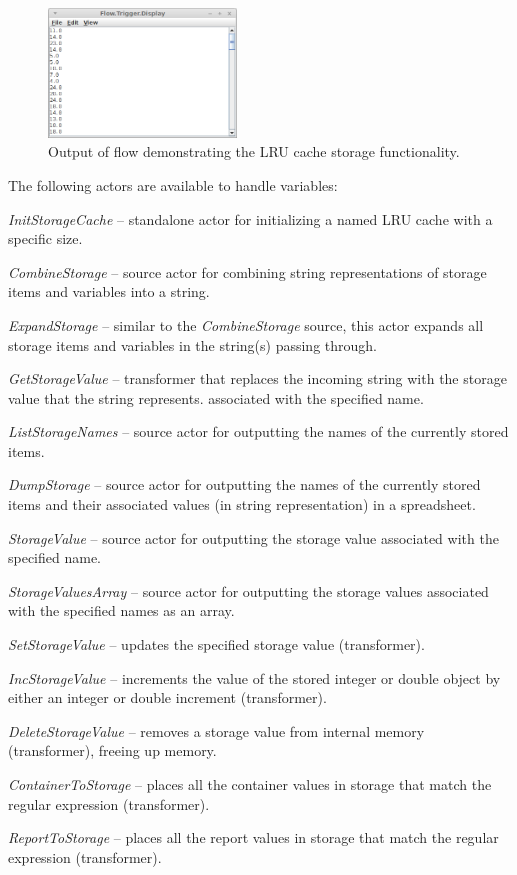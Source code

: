 \begin{figure}[htb]
  \centering
  \includegraphics[width=5.0cm]{images/floweditor-storage2_output.png}
  \caption{Output of flow demonstrating the LRU cache storage
  functionality.}
  \label{floweditor-storage2_output}
\end{figure}

The following actors are available to handle variables:
\begin{tight_itemize}
	\item \textit{InitStorageCache} -- standalone actor for initializing a named
	LRU cache with a specific size.
	\item \textit{CombineStorage} -- source actor for combining string 
	representations of storage items and variables into a string.
	\item \textit{ExpandStorage} -- similar to the \textit{CombineStorage}
	source, this actor expands all storage items and variables in the string(s) 
	passing through.
	\item \textit{GetStorageValue} -- transformer that replaces the incoming 
	string with the storage value that the string represents.
	associated with the specified name.
	\item \textit{ListStorageNames} -- source actor for outputting the names of 
	the currently stored items.
	\item \textit{DumpStorage} -- source actor for outputting the names of
	the currently stored items and their associated values (in string
	representation) in a spreadsheet.
	\item \textit{StorageValue} -- source actor for outputting the storage value
	associated with the specified name.
	\item \textit{StorageValuesArray} -- source actor for outputting the 
	storage values associated with the specified names as an array.
	\item \textit{SetStorageValue} -- updates the specified storage value
	(transformer).
	\item \textit{IncStorageValue} -- increments the value of the stored integer or
	double object by either an integer or double increment (transformer).
	\item \textit{DeleteStorageValue} -- removes a storage value
	from internal memory (transformer), freeing up memory.
	\item \textit{ContainerToStorage} -- places all the container values in storage
	that match the regular expression (transformer).
	\item \textit{ReportToStorage} -- places all the report values in storage
	that match the regular expression (transformer).
\end{tight_itemize}


